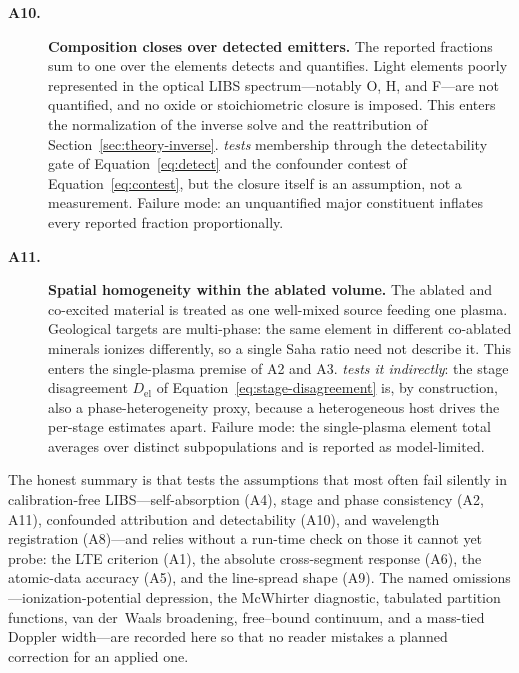 \begin{description}
\item[\textbf{A10.}] \textbf{Composition closes over detected emitters.}
The reported fractions sum to one over the elements \alibz{} detects and quantifies.
Light elements poorly represented in the optical LIBS spectrum---notably O, H, and
F---are not quantified, and no oxide or stoichiometric closure is imposed. This enters
the normalization of the inverse solve and the reattribution of
Section~\ref{sec:theory-inverse}. \alibz{} \emph{tests} membership through the
detectability gate of Equation~\eqref{eq:detect} and the confounder contest of
Equation~\eqref{eq:contest}, but the closure itself is an assumption, not a
measurement. Failure mode: an unquantified major constituent inflates every reported
fraction proportionally.

\item[\textbf{A11.}] \textbf{Spatial homogeneity within the ablated volume.}
The ablated and co-excited material is treated as one well-mixed source feeding one
plasma. Geological targets are multi-phase: the same element in different co-ablated
minerals ionizes differently, so a single Saha ratio need not describe it. This enters
the single-plasma premise of A2 and A3. \alibz{} \emph{tests it indirectly}: the stage
disagreement $D_\mathrm{el}$ of Equation~\eqref{eq:stage-disagreement} is, by
construction, also a phase-heterogeneity proxy, because a heterogeneous host drives the
per-stage estimates apart. Failure mode: the single-plasma element total averages over
distinct subpopulations and is reported as model-limited.

\end{description}

\noindent The honest summary is that \alibz{} tests the assumptions that most often
fail silently in calibration-free LIBS---self-absorption (A4), stage and phase
consistency (A2, A11), confounded attribution and detectability (A10), and wavelength
registration (A8)---and relies without a run-time check on those it cannot yet probe:
the LTE criterion (A1), the absolute cross-segment response (A6), the atomic-data
accuracy (A5), and the line-spread shape (A9). The named omissions---ionization-potential
depression, the McWhirter diagnostic, tabulated partition functions, van der~Waals
broadening, free--bound continuum, and a mass-tied Doppler width---are recorded here so
that no reader mistakes a planned correction for an applied one.
